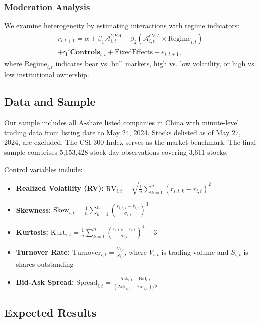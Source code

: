 \documentclass[preprint,12pt,authoryear]{elsarticle}
\begin{document}
\subsubsection{Moderation Analysis}
We examine heterogeneity by estimating interactions with regime indicators:
\begin{equation}
\begin{split}
r_{i,t+1} = \alpha + \beta_1 \mathcal{A}^{CEA}_{i,t} + \beta_2 (\mathcal{A}^{CEA}_{i,t} \times \text{Regime}_{i,t}) \\
+ \mathbf{\gamma}'\mathbf{Controls}_{i,t} + \text{FixedEffects} + \varepsilon_{i,t+1},
\end{split}
\end{equation}
where $\text{Regime}_{i,t}$ indicates bear vs. bull markets, high vs. low volatility, or high vs. low institutional ownership.

\subsection{Data and Sample}

Our sample includes all A-share listed companies in China with minute-level trading data from listing date to May 24, 2024. Stocks delisted as of May 27, 2024, are excluded. The CSI 300 Index serves as the market benchmark. The final sample comprises 5,153,428 stock-day observations covering 3,611 stocks.

Control variables include:
\begin{itemize}
\item \textbf{Realized Volatility (RV):} $\text{RV}_{i,t} = \sqrt{\frac{1}{n} \sum_{k=1}^{n} (r_{i,t,k} - \bar{r}_{i,t})^2}$
\item \textbf{Skewness:} $\text{Skew}_{i,t} = \frac{1}{n} \sum_{k=1}^{n} \left(\frac{r_{i,t,k} - \bar{r}_{i,t}}{\sigma_{i,t}}\right)^3$
\item \textbf{Kurtosis:} $\text{Kurt}_{i,t} = \frac{1}{n} \sum_{k=1}^{n} \left(\frac{r_{i,t,k} - \bar{r}_{i,t}}{\sigma_{i,t}}\right)^4 - 3$
\item \textbf{Turnover Rate:} $\text{Turnover}_{i,t} = \frac{V_{i,t}}{S_{i,t}}$, where $V_{i,t}$ is trading volume and $S_{i,t}$ is shares outstanding
\item \textbf{Bid-Ask Spread:} $\text{Spread}_{i,t} = \frac{\text{Ask}_{i,t} - \text{Bid}_{i,t}}{(\text{Ask}_{i,t} + \text{Bid}_{i,t})/2}$
\end{itemize}

\subsection{Expected Results}
\end{document}
